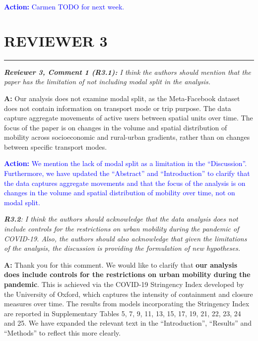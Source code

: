 \documentclass[12pt,a4paper,oneside, reqno]{amsart}
\begin{document}
\textcolor{blue}{\textbf{Action:} Carmen TODO for next week.}

\vspace{10pt}

\section*{\textbf{REVIEWER 3}}
\setlength{\leftskip}{0cm} 
\vspace{-16pt}
\begin{center}
    \rule{\textwidth}{.1pt}
\end{center}

\vspace{5pt}

\setlength{\leftskip}{0cm} \textit{\textbf{Reviewer 3, Comment 1 (R3.1):} I think the authors should mention that the paper has the limitation of not including modal split in the analysis.}

\setlength{\leftskip}{1cm}\textbf{A:} Our analysis does not examine modal split, as the Meta-Facebook dataset does not contain information on transport mode or trip purpose. The data capture aggregate movements of active users between spatial units over time. The focus of the paper is on changes in the volume and spatial distribution of mobility across socioeconomic and rural-urban gradients, rather than on changes between specific transport modes.

\textcolor{blue}{\textbf{Action:} We mention the lack of modal split as a limitation in the ``Discussion''. Furthermore, we have updated the ``Abstract'' and ``Introduction'' to clarify that the data captures aggregate movements and that the focus of the analysis is on changes in the volume and spatial distribution of mobility over time, not on modal split.}

\setlength{\leftskip}{0cm} \textit{\textbf{R3.2}: I think the authors should acknowledge that the data analysis does not include controls for the restrictions on urban mobility during the pandemic of COVID-19. Also, the authors should also acknowledge that given the limitations of the analysis, the discussion is providing the formulation of new hypotheses.}

\setlength{\leftskip}{1cm}\textbf{A:} Thank you for this comment. We would like to clarify that \textbf{our analysis does include controls for the restrictions on urban mobility during the pandemic}. This is achieved via the COVID-19 Stringency Index developed by the University of Oxford, which captures the intensity of containment and closure measures over time. The results from models incorporating the Stringency Index are reported in Supplementary Tables 5, 7, 9, 11, 13, 15, 17, 19, 21, 22, 23, 24 and 25. We have expanded the relevant text in the ``Introduction'', ``Results'' and ``Methods'' to reflect this more clearly.
\end{document}
